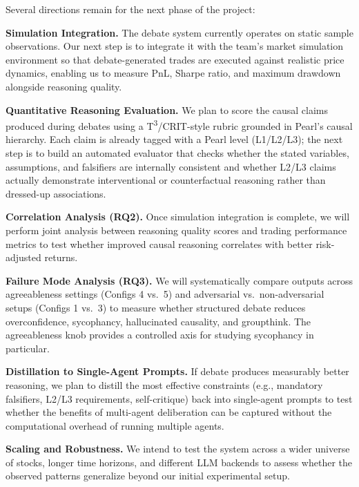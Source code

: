 Several directions remain for the next phase of the project:

\textbf{Simulation Integration.}
The debate system currently operates on static sample observations. Our next step is to integrate it with the team's market simulation environment so that debate-generated trades are executed against realistic price dynamics, enabling us to measure PnL, Sharpe ratio, and maximum drawdown alongside reasoning quality.

\textbf{Quantitative Reasoning Evaluation.}
We plan to score the causal claims produced during debates using a T\textsuperscript{3}/CRIT-style rubric grounded in Pearl's causal hierarchy. Each claim is already tagged with a Pearl level (L1/L2/L3); the next step is to build an automated evaluator that checks whether the stated variables, assumptions, and falsifiers are internally consistent and whether L2/L3 claims actually demonstrate interventional or counterfactual reasoning rather than dressed-up associations.

\textbf{Correlation Analysis (RQ2).}
Once simulation integration is complete, we will perform joint analysis between reasoning quality scores and trading performance metrics to test whether improved causal reasoning correlates with better risk-adjusted returns.

\textbf{Failure Mode Analysis (RQ3).}
We will systematically compare outputs across agreeableness settings (Configs 4 vs.\ 5) and adversarial vs.\ non-adversarial setups (Configs 1 vs.\ 3) to measure whether structured debate reduces overconfidence, sycophancy, hallucinated causality, and groupthink. The agreeableness knob provides a controlled axis for studying sycophancy in particular.

\textbf{Distillation to Single-Agent Prompts.}
If debate produces measurably better reasoning, we plan to distill the most effective constraints (e.g., mandatory falsifiers, L2/L3 requirements, self-critique) back into single-agent prompts to test whether the benefits of multi-agent deliberation can be captured without the computational overhead of running multiple agents.

\textbf{Scaling and Robustness.}
We intend to test the system across a wider universe of stocks, longer time horizons, and different LLM backends to assess whether the observed patterns generalize beyond our initial experimental setup.
